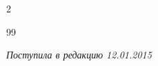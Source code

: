 \begin{multicols}{2}
{{\begin{thebibliography}{99}







































\end{thebibliography}


} }





\end{multicols}





 \label{end\stat}










\hfill{\small\textit{Поступила в редакцию 12.01.2015}}


\renewcommand{\bibname}{\protect\rm Литература}


\renewcommand{\figurename}{\protect\bf Рис.}


\renewcommand{\tablename}{\protect\bf Таблица}








